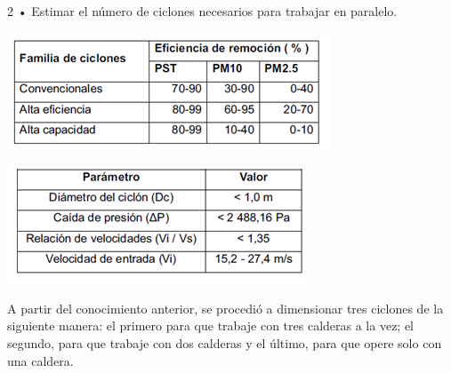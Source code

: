 \documentclass[12pt,spanish,Letterpaper,openany]{book}
\newcommand{\spacetenmilis}{\vspace{10mm}}
\newcommand{\spacesevenmilis}{\vspace{7mm}}
\begin{document}
\begin {multicols}{2}
• Estimar el número de ciclones necesarios para trabajar en paralelo.

\begin {flushleft}
\noindent\begin{minipage}[c]{\columnwidth}

\centering

\includegraphics[width=1\linewidth]{images/image10_wvaliente}

\spacetenmilis

\centering

\includegraphics[width=1\linewidth]{images/image11_wvaliente}

\end{minipage}

\end {flushleft}

\spacesevenmilis

A partir del conocimiento anterior, se procedió a dimensionar tres ciclones de la siguiente manera: el primero para que trabaje con tres calderas a la vez; el segundo, para que trabaje con dos calderas y el último, para que opere solo con una caldera.

\spacesevenmilis

\begin {flushleft}
\noindent\begin{minipage}[c]{\columnwidth}


\end{minipage}
\end{flushleft}
\end{multicols}
\end{document}
